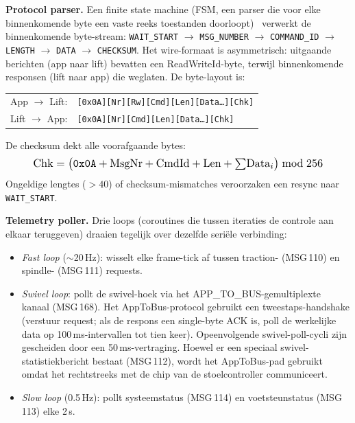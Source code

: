 \documentclass[10pt, a4paper, twocolumn]{article}
\begin{document}
\textbf{Protocol parser.} Een finite state machine (FSM, een parser die voor
elke binnenkomende byte een vaste reeks toestanden
doorloopt)~\cite{graham2014fsm} verwerkt de binnenkomende byte-stream: \texttt{WAIT\_START} $\to$
\texttt{MSG\_NUMBER} $\to$ \texttt{COMMAND\_ID} $\to$ \texttt{LENGTH} $\to$
\texttt{DATA} $\to$ \texttt{CHECKSUM}. Het wire-formaat is asymmetrisch: uitgaande berichten (app naar lift) bevatten een
ReadWriteId-byte, terwijl binnenkomende responsen (lift naar app) die weglaten.
De byte-layout is:

\begin{center}
\footnotesize
\begin{tabular}{@{}r@{\ \ }l@{}}
App $\to$ Lift: & \texttt{[0x0A][Nr][Rw][Cmd][Len][Data\ldots][Chk]} \\
Lift $\to$ App: & \texttt{[0x0A][Nr][Cmd][Len][Data\ldots][Chk]}
\end{tabular}
\end{center}

De checksum dekt alle voorafgaande bytes:
\begin{equation}
\label{eq:checksum}
\resizebox{0.88\columnwidth}{!}{$\displaystyle
\text{Chk} = \bigl(\texttt{0x0A} + \text{MsgNr} + \text{CmdId}
  + \text{Len} + {\textstyle\sum} \text{Data}_i\bigr) \bmod 256
$}
\end{equation}
Ongeldige lengtes ($>40$) of checksum-mismatches veroorzaken een resync naar
\texttt{WAIT\_START}.

\textbf{Telemetry poller.} Drie loops (coroutines die tussen iteraties de
controle aan elkaar teruggeven) draaien tegelijk over dezelfde seriële
verbinding:
\begin{itemize}[leftmargin=*]
  \item \textit{Fast loop} ($\sim$20\,Hz): wisselt elke frame-tick af tussen
    traction- (MSG\,110) en spindle- (MSG\,111) requests.
  \item \textit{Swivel loop}: pollt de swivel-hoek via het
    APP\_TO\_BUS-gemultiplexte kanaal (MSG\,168). Het AppToBus-protocol gebruikt
    een tweestaps-handshake (verstuur request; als de respons een single-byte
    ACK is, poll de werkelijke data op 100\,ms-intervallen tot tien keer).
    Opeenvolgende swivel-poll-cycli zijn gescheiden door een 50\,ms-vertraging.
    Hoewel er een speciaal swivel-statistiekbericht bestaat (MSG\,112), wordt
    het AppToBus-pad gebruikt omdat het rechtstreeks met de chip van de
    stoelcontroller communiceert.
  \item \textit{Slow loop} (0.5\,Hz): pollt systeemstatus (MSG\,114) en
    voetsteunstatus (MSG\,113) elke 2\,s.
\end{itemize}
\end{document}
